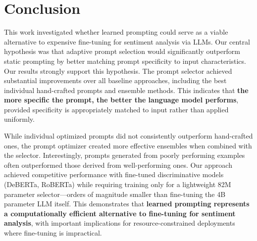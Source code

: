 \documentclass{article}
\theoremstyle{plain}
\theoremstyle{definition}
\theoremstyle{remark}
\begin{document}


\section{Conclusion}

This work investigated whether learned prompting could serve as a viable alternative to expensive fine-tuning for sentiment analysis via LLMs. Our central hypothesis was that adaptive prompt selection would significantly outperform static prompting by better matching prompt specificity to input characteristics.
Our results strongly support this hypothesis. The prompt selector achieved substantial improvements over all baseline approaches, including the best individual hand-crafted prompts and ensemble methods. This indicates that \textbf{the more specific the prompt, the better the language model performs}, provided specificity is appropriately matched to input rather than applied uniformly.

While individual optimized prompts did not consistently outperform hand-crafted ones, the prompt optimizer created more effective ensembles when combined with the selector. Interestingly, prompts generated from poorly performing examples often outperformed those derived from well-performing ones.
Our approach achieved competitive performance with fine-tuned discriminative models (DeBERTa, RoBERTa) while requiring training only for a lightweight 82M parameter selector—orders of magnitude smaller than fine-tuning the 4B parameter LLM itself. This demonstrates that \textbf{learned prompting represents a computationally efficient alternative to fine-tuning for sentiment analysis}, with important implications for resource-constrained deployments where fine-tuning is impractical.
\end{document}
